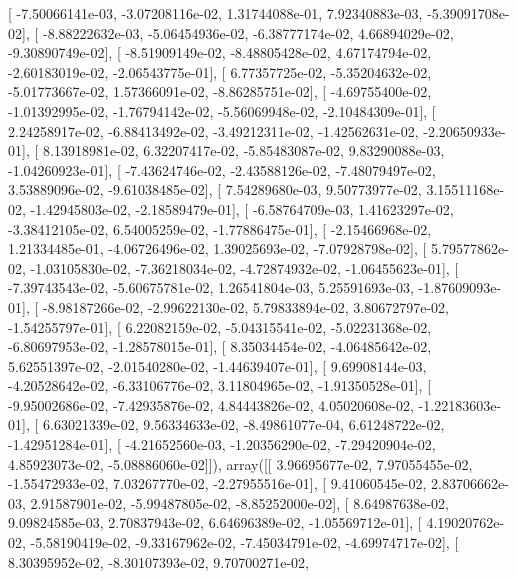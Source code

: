 \documentclass{article}
\begin{document}
       [ -7.50066141e-03,  -3.07208116e-02,   1.31744088e-01,
          7.92340883e-03,  -5.39091708e-02],
       [ -8.88222632e-03,  -5.06454936e-02,  -6.38777174e-02,
          4.66894029e-02,  -9.30890749e-02],
       [ -8.51909149e-02,  -8.48805428e-02,   4.67174794e-02,
         -2.60183019e-02,  -2.06543775e-01],
       [  6.77357725e-02,  -5.35204632e-02,  -5.01773667e-02,
          1.57366091e-02,  -8.86285751e-02],
       [ -4.69755400e-02,  -1.01392995e-02,  -1.76794142e-02,
         -5.56069948e-02,  -2.10484309e-01],
       [  2.24258917e-02,  -6.88413492e-02,  -3.49212311e-02,
         -1.42562631e-02,  -2.20650933e-01],
       [  8.13918981e-02,   6.32207417e-02,  -5.85483087e-02,
          9.83290088e-03,  -1.04260923e-01],
       [ -7.43624746e-02,  -2.43588126e-02,  -7.48079497e-02,
          3.53889096e-02,  -9.61038485e-02],
       [  7.54289680e-03,   9.50773977e-02,   3.15511168e-02,
         -1.42945803e-02,  -2.18589479e-01],
       [ -6.58764709e-03,   1.41623297e-02,  -3.38412105e-02,
          6.54005259e-02,  -1.77886475e-01],
       [ -2.15466968e-02,   1.21334485e-01,  -4.06726496e-02,
          1.39025693e-02,  -7.07928798e-02],
       [  5.79577862e-02,  -1.03105830e-02,  -7.36218034e-02,
         -4.72874932e-02,  -1.06455623e-01],
       [ -7.39743543e-02,  -5.60675781e-02,   1.26541804e-03,
          5.25591693e-03,  -1.87609093e-01],
       [ -8.98187266e-02,  -2.99622130e-02,   5.79833894e-02,
          3.80672797e-02,  -1.54255797e-01],
       [  6.22082159e-02,  -5.04315541e-02,  -5.02231368e-02,
         -6.80697953e-02,  -1.28578015e-01],
       [  8.35034454e-02,  -4.06485642e-02,   5.62551397e-02,
         -2.01540280e-02,  -1.44639407e-01],
       [  9.69908144e-03,  -4.20528642e-02,  -6.33106776e-02,
          3.11804965e-02,  -1.91350528e-01],
       [ -9.95002686e-02,  -7.42935876e-02,   4.84443826e-02,
          4.05020608e-02,  -1.22183603e-01],
       [  6.63021339e-02,   9.56334633e-02,  -8.49861077e-04,
          6.61248722e-02,  -1.42951284e-01],
       [ -4.21652560e-03,  -1.20356290e-02,  -7.29420904e-02,
          4.85923073e-02,  -5.08886060e-02]]), array([[  3.96695677e-02,   7.97055455e-02,  -1.55472933e-02,
          7.03267770e-02,  -2.27955516e-01],
       [  9.41060545e-02,   2.83706662e-03,   2.91587901e-02,
         -5.99487805e-02,  -8.85252000e-02],
       [  8.64987638e-02,   9.09824585e-03,   2.70837943e-02,
          6.64696389e-02,  -1.05569712e-01],
       [  4.19020762e-02,  -5.58190419e-02,  -9.33167962e-02,
         -7.45034791e-02,  -4.69974717e-02],
       [  8.30395952e-02,  -8.30107393e-02,   9.70700271e-02,
\end{document}
